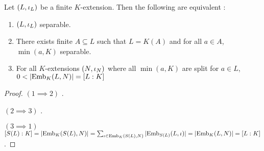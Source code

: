 \documentclass[main.tex]{subfiles}
\begin{document}
\begin{thm} 
  
  Let $(L,\iota_L)$ be a finite $K$-extension. 
  Then the following are equivalent : 
  \begin{enumerate}
    \item $(L,\iota_L)$ separable. 
    \item There exists finite $A \subseteq L$ such that 
    $L = K(A)$ and for all $a \in A$, $\min(a,K)$ separable. 
    \item For all $K$-extensions $(N,\iota_N)$ where 
    all $\min(a,K)$ are split for $a \in L$, 
    $0 < |\mathrm{Emb}_{K}(L, N)| = [L : K]$
  \end{enumerate}
\end{thm}
\begin{proof}
  $(1 \implies 2)$ . 

  $(2 \implies 3)$ . 

  $(3 \implies 1)$ $[S(L) : K] = |\mathrm{Emb}_{K}(S(L), N)| 
  = \sum_{\iota \in \mathrm{Emb}_{K}(S(L), N)} |\mathrm{Emb}_{S(L)}(L, \iota)| 
  = |\mathrm{Emb}_{K}(L, N)| = [L : K]$.
\end{proof}
\end{document}
